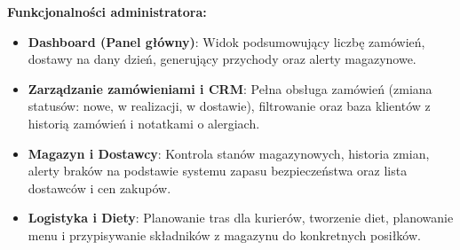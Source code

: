 \textbf{Funkcjonalności administratora:}
\begin{itemize}
    \item \textbf{Dashboard (Panel główny)}: Widok podsumowujący liczbę zamówień, dostawy na dany dzień, generujący przychody oraz alerty magazynowe.
    \item \textbf{Zarządzanie zamówieniami i CRM}: Pełna obsługa zamówień (zmiana statusów: nowe, w realizacji, w dostawie), filtrowanie oraz baza klientów z historią zamówień i notatkami o alergiach.
    \item \textbf{Magazyn i Dostawcy}: Kontrola stanów magazynowych, historia zmian, alerty braków na podstawie systemu zapasu bezpieczeństwa oraz lista dostawców i cen zakupów.
    \item \textbf{Logistyka i Diety}: Planowanie tras dla kurierów, tworzenie diet, planowanie menu i przypisywanie składników z magazynu do konkretnych posiłków.
\end{itemize}